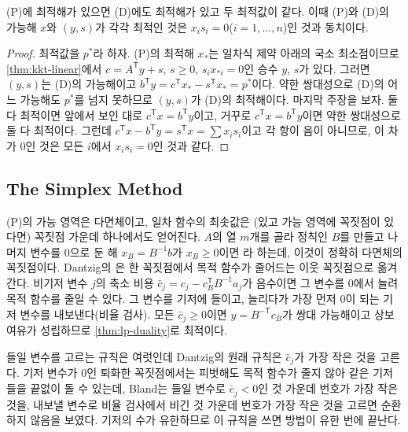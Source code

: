 \begin{theorem}[선형계획의 쌍대 정리]
\label{thm:lp-duality}
(P)에 최적해가 있으면 (D)에도 최적해가 있고 두 최적값이 같다. 이때 (P)와 (D)의 가능해 $x$와 $(y,s)$가 각각 최적인 것은 $x_is_i=0$($i=1,\dots,n$)인 것과 동치이다.
\end{theorem}

\begin{proof}
최적값을 $p^\ast$라 하자. (P)의 최적해 $x_\ast$는 일차식 제약 아래의 국소 최소점이므로 \cref{thm:kkt-linear}에서 $c=A^{\mathsf T}y+s$, $s\ge0$, $s_ix_{\ast i}=0$인 승수 $y$, $s$가 있다. 그러면 $(y,s)$는 (D)의 가능해이고 $b^{\mathsf T}y=c^{\mathsf T}x_\ast-s^{\mathsf T}x_\ast=p^\ast$이다. 약한 쌍대성으로 (D)의 어느 가능해도 $p^\ast$를 넘지 못하므로 $(y,s)$가 (D)의 최적해이다. 마지막 주장을 보자. 둘 다 최적이면 앞에서 보인 대로 $c^{\mathsf T}x=b^{\mathsf T}y$이고, 거꾸로 $c^{\mathsf T}x=b^{\mathsf T}y$이면 약한 쌍대성으로 둘 다 최적이다. 그런데 $c^{\mathsf T}x-b^{\mathsf T}y=s^{\mathsf T}x=\sum x_is_i$이고 각 항이 음이 아니므로, 이 차가 $0$인 것은 모든 $i$에서 $x_is_i=0$인 것과 같다.
\end{proof}

\subsection{The Simplex Method}

(P)의 가능 영역은 다면체이고, 일차 함수의 최솟값은 (있고 가능 영역에 꼭짓점이 있다면) 꼭짓점 가운데 하나에서도 얻어진다. $A$의 열 $m$개를 골라 정칙인 $B$를 만들고 나머지 변수를 $0$으로 둔 해 $x_B=B^{-1}b$가 $x_B\ge0$이면 라 하는데, 이것이 정확히 다면체의 꼭짓점이다. Dantzig의 은 한 꼭짓점에서 목적 함수가 줄어드는 이웃 꼭짓점으로 옮겨 간다\cite{dantzig1963}. 비기저 변수 $j$의 축소 비용 $\bar c_j=c_j-c_B^{\mathsf T}B^{-1}a_j$가 음수이면 그 변수를 $0$에서 늘려 목적 함수를 줄일 수 있다. 그 변수를 기저에 들이고, 늘리다가 가장 먼저 $0$이 되는 기저 변수를 내보낸다(비율 검사). 모든 $\bar c_j\ge0$이면 $y=B^{-\mathsf T}c_B$가 쌍대 가능해이고 상보 여유가 성립하므로 \cref{thm:lp-duality}로 최적이다.

들일 변수를 고르는 규칙은 여럿인데 Dantzig의 원래 규칙은 $\bar c_j$가 가장 작은 것을 고른다. 기저 변수가 $0$인 퇴화한 꼭짓점에서는 피벗해도 목적 함수가 줄지 않아 같은 기저들을 끝없이 돌 수 있는데, Bland는 들일 변수로 $\bar c_j<0$인 것 가운데 번호가 가장 작은 것을, 내보낼 변수로 비율 검사에서 비긴 것 가운데 번호가 가장 작은 것을 고르면 순환하지 않음을 보였다\cite{bland1977}. 기저의 수가 유한하므로 이 규칙을 쓰면 방법이 유한 번에 끝난다.

